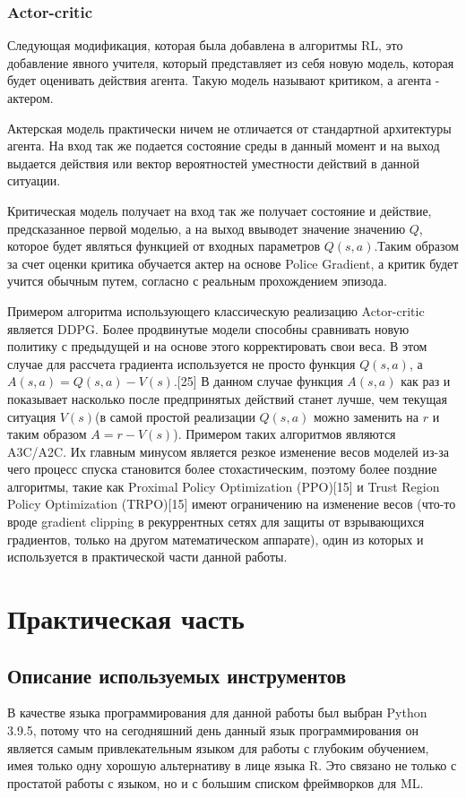 \documentclass[bachelor, och, coursework]{shiza}
\begin{document}
\subsubsection{Actor-critic}
Следующая модификация, которая была добавлена в алгоритмы RL, это добавление явного учителя, который представляет из себя новую модель, которая будет оценивать действия
агента. Такую модель называют критиком, а агента - актером.

Актерская модель практически ничем не отличается от стандартной архитектуры агента. На вход так же подается состояние среды в данный момент и на выход выдается действия
или вектор вероятностей уместности действий в данной ситуации.

Критическая модель получает на вход так же получает состояние и действие, предсказанное первой моделью, а на выход ввыводет значение значению $Q$, которое будет
являться функцией от входных параметров $Q(s, a)$.Таким образом за счет оценки критика обучается актер на основе Police Gradient, а критик будет учится обычным
путем, согласно с реальным прохождением эпизода.

Примером алгоритма использующего классическую реализацию Actor-critic является DDPG. Более продвинутые модели способны сравнивать новую политику с предыдущей
и на основе этого корректировать свои веса. В этом случае для рассчета градиента используется не просто функция $Q(s,a)$, а $A(s,a) = Q(s,a) - V(s)$.[25] В данном случае
функция $A(s, a)$ как раз и показывает насколько после предпринятых действий станет лучше, чем текущая ситуация $V(s)$(в самой простой реализации $Q(s,a)$ можно
заменить на $r$ и таким образом $A = r - V(s)$). Примером таких алгоритмов являются A3C/A2C. Их главным минусом является резкое изменение весов моделей из-за чего
процесс спуска становится более стохастическим, поэтому более поздние алгоритмы, такие как Proximal Policy Optimization (PPO)[15] и Trust Region Policy Optimization (TRPO)[15]
имеют ограничению на изменение весов (что-то вроде gradient clipping в рекуррентных сетях для защиты от взрывающихся градиентов, только на другом математическом аппарате),
один из которых и используется в практической части данной работы.

\section{Практическая часть}
\subsection{Описание используемых инструментов}
В качестве языка программирования для данной работы был выбран Python 3.9.5, потому что на сегодняшний день данный язык программирования он является самым привлекательным
языком для работы с глубоким обучением, имея только одну хорошую альтернативу в лице языка R. Это связано не только с простатой работы с языком, но и с большим списком
фреймворков для ML.
\end{document}
